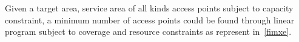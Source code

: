 Given a target area, service area of all kinds access points subject to capacity constraint, 
a minimum number of access points could be found through linear program subject to 
coverage and resource constraints as represent in~\ref{fimxe}. 






